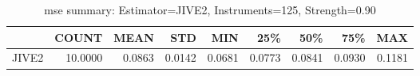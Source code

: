 \begin{table}[ht]
\centering
\caption{mse summary: Estimator=JIVE2, Instruments=125, Strength=0.90}
\begin{tabular}{lrrrrrrrr}
\toprule
 & COUNT & MEAN & STD & MIN & 25\% & 50\% & 75\% & MAX \\
\midrule
JIVE2 & 10.0000 & 0.0863 & 0.0142 & 0.0681 & 0.0773 & 0.0841 & 0.0930 & 0.1181 \\
\bottomrule
\end{tabular}
\end{table}
